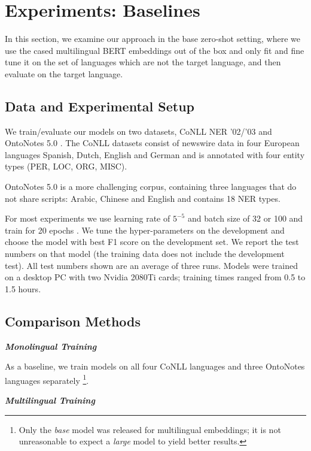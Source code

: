 \documentclass[letterpaper]{article} \usepackage{aaai20}  \usepackage{times}  \usepackage{helvet} \usepackage{courier}  \usepackage[hyphens]{url}  \usepackage{graphicx} \urlstyle{rm} \def\UrlFont{\rm}  \usepackage{graphicx}  \frenchspacing  \setlength{\pdfpagewidth}{8.5in}  \setlength{\pdfpageheight}{11in}  \usepackage{amsmath}
\begin{document}
 \section{Experiments: Baselines} \label{sec:exp:zero-shot}

In this section, we examine our approach in the base zero-shot setting, where we use the cased multilingual BERT embeddings out of the box and only fit and fine tune it on the set of languages which are not the target language, and then evaluate on the target language.

\subsection{Data and Experimental Setup}

We train/evaluate our models on two datasets, CoNLL NER '02/'03 \cite{TjongKimSang:2002:ICS:1118853.1118877} and
OntoNotes 5.0 \cite{ontonotes5}.  The CoNLL datasets consist of
newswire data in four European languages Spanish, Dutch, English and
German
and is annotated with four entity types (PER, LOC, ORG, MISC).

OntoNotes 5.0 is a more challenging corpus, containing three languages
that do not share scripts: Arabic, Chinese and English and contains 18
NER types.


For most experiments we use learning rate of $5^{-5}$ and batch size of
32 or 100 and train for 20 epochs
. We tune the hyper-parameters on the development and choose the model
with best F1 score on the development set. We report the test numbers
on that model (the training data does not include the development
test). All test numbers shown are an average of three runs. Models
were trained on a desktop PC with two Nvidia 2080Ti cards; training
times ranged from 0.5 to 1.5 hours.

\subsection{Comparison Methods}

\textbf{\textit{Monolingual Training}}

As a baseline, we train models
on all four CoNLL languages and three OntoNotes languages separately
\footnote{Only the \textit{base} model was released for multilingual
  embeddings; it is not unreasonable to expect a \textit{large} model
  to yield better results.}.


\vspace*{1mm}\noindent \textbf{\textit{Multilingual Training}}
\end{document}
